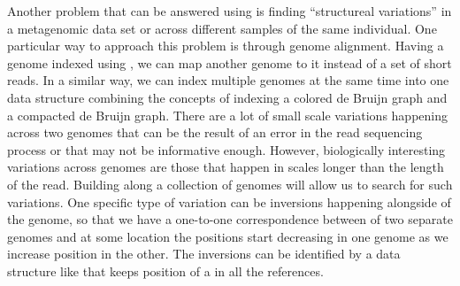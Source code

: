 Another problem that can be answered using \pufferfish is finding ``structureal variations'' in a metagenomic data set or across different samples of the same individual. One particular way to approach this problem is through genome alignment. Having a genome indexed using \pufferfish, we can map another genome to it instead of a set of short reads. In a similar way, we can index multiple genomes at the same time into one data structure combining the concepts of indexing a colored de Bruijn graph and a compacted de Bruijn graph. There are a lot of small scale variations happening across two genomes that can be the result of an error in the read sequencing process or that may not be informative enough. However, biologically interesting variations across genomes are those that happen in scales longer than the length of the read. Building \pufferfish along a collection of genomes will allow us to search for such variations. One specific type of variation can be inversions happening alongside of the genome, so that we have a one-to-one correspondence between \kmers of two separate genomes and at some location the positions start decreasing in one genome as we increase position in the other. The inversions can be identified by a data structure like \pufferfish that keeps position of a \kmer in all the references.
